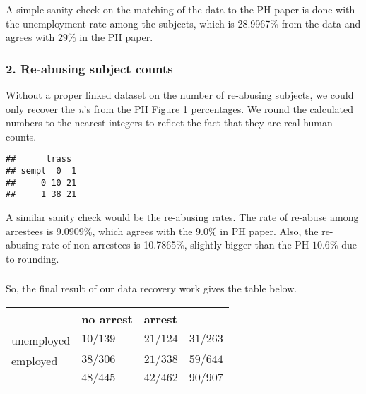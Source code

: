 \documentclass{article}\usepackage{graphicx, color}
\makeatletter
\newenvironment{kframe}{%
 \def\at@end@of@kframe{}%
 \ifinner\ifhmode%
  \def\at@end@of@kframe{\end{minipage}}%
  \begin{minipage}{\columnwidth}%
 \fi\fi%
 \def\FrameCommand##1{\hskip\@totalleftmargin \hskip-\fboxsep
 \colorbox{shadecolor}{##1}\hskip-\fboxsep
     \hskip-\linewidth \hskip-\@totalleftmargin \hskip\columnwidth}%
 \MakeFramed {\advance\hsize-\width
   \@totalleftmargin\z@ \linewidth\hsize
   \@setminipage}}%
 {\par\unskip\endMakeFramed%
 \at@end@of@kframe}
\newenvironment{knitrout}{}{} %
\makeatother
\begin{document}
A simple sanity check on the matching of the data to the PH paper is
done with the unemployment rate among the subjects, which is 
28.9967\% from the data and
agrees with $29\%$ in the PH paper.


\subsubsection*{2. Re-abusing subject counts}
\hspace{12 pt} Without a proper linked dataset on the number of
re-abusing subjects, we could only recover the \textit{n}'s from the
PH Figure 1 percentages. We round the calculated numbers to the nearest integers to
reflect the fact that they are real human counts.

\begin{knitrout}
\color{fgcolor}\begin{kframe}
\begin{verbatim}
##      trass
## sempl  0  1
##     0 10 21
##     1 38 21
\end{verbatim}
\end{kframe}
\end{knitrout}


A similar sanity check would be the re-abusing rates. The rate of
re-abuse among arrestees is 9.0909\%,
which agrees with the $9.0\%$ in PH paper. Also, the re-abusing rate of
non-arrestees is 10.7865\%,  
slightly bigger than the PH $10.6\%$ due to rounding.


\subsubsection*{}
So, the final result of our data recovery work gives the table below.

\begin{center}
\begin{tabular}{l|l|l|l}
                    & no arrest     & arrest          & \\ \hline
unemployed & {$10/139$} & {$21/124$} & {$31/263$}\\ \hline
employed     & {$38/306$} & {$21/338$} & {$59/644$}\\ \hline
                    & {$48/445$} & {$42/462$} & {$90/907$}\\ 
\end{tabular}
\end{center}




\newpage
\end{document}
